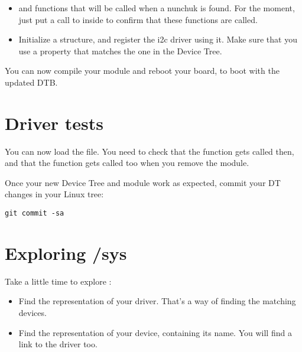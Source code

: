 \begin{itemize}
\item {} and  functions that will
      be called when a nunchuk is found.
      For the moment, just put a call to  inside
      to confirm that these functions are called.
\item Initialize a  structure, and register
      the i2c driver using it. Make sure that you use
      a  property that matches the one in the
      Device Tree.
\end{itemize}

You can now compile your module and reboot your board, to
boot with the updated DTB.

\section{Driver tests}

You can now load the  file.
You need to check that the  function gets called
then, and that the  function gets called too
when you remove the module.

Once your new Device Tree and module work as expected, commit
your DT changes in your Linux tree:

\begin{verbatim}
git commit -sa
\end{verbatim}

\section{Exploring /sys}

Take a little time to explore :

\begin{itemize}
\item Find the representation of your driver. That's a way
      of finding the matching devices.
\item Find the representation of your device, containing its name.
      You will find a link to the driver too.
\end{itemize}
